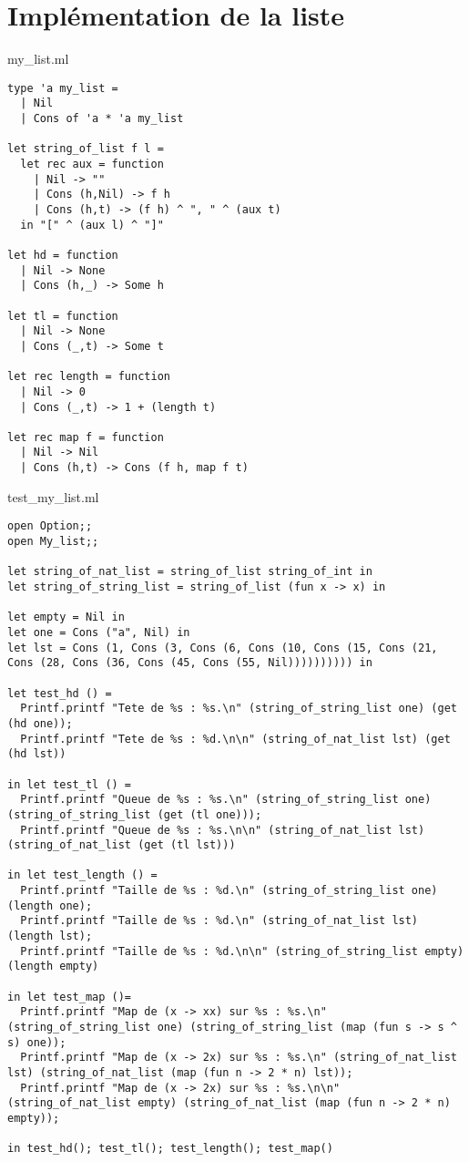 \documentclass{report}
\title{}
\author{}
\date{\today}
\begin{document}
\section{Implémentation de la liste}

{\small my\_list.ml}
\begin{lstlisting}[language=caml, style=xslt]
type 'a my_list = 
  | Nil
  | Cons of 'a * 'a my_list

let string_of_list f l =
  let rec aux = function
    | Nil -> ""
    | Cons (h,Nil) -> f h
    | Cons (h,t) -> (f h) ^ ", " ^ (aux t)
  in "[" ^ (aux l) ^ "]"

let hd = function
  | Nil -> None
  | Cons (h,_) -> Some h

let tl = function
  | Nil -> None
  | Cons (_,t) -> Some t

let rec length = function
  | Nil -> 0
  | Cons (_,t) -> 1 + (length t)

let rec map f = function
  | Nil -> Nil
  | Cons (h,t) -> Cons (f h, map f t)
\end{lstlisting}

{\small test\_my\_list.ml}
\begin{lstlisting}[language=caml, style=xslt]
open Option;;
open My_list;;

let string_of_nat_list = string_of_list string_of_int in
let string_of_string_list = string_of_list (fun x -> x) in

let empty = Nil in
let one = Cons ("a", Nil) in 
let lst = Cons (1, Cons (3, Cons (6, Cons (10, Cons (15, Cons (21, Cons (28, Cons (36, Cons (45, Cons (55, Nil)))))))))) in

let test_hd () = 
  Printf.printf "Tete de %s : %s.\n" (string_of_string_list one) (get (hd one));
  Printf.printf "Tete de %s : %d.\n\n" (string_of_nat_list lst) (get (hd lst))

in let test_tl () = 
  Printf.printf "Queue de %s : %s.\n" (string_of_string_list one) (string_of_string_list (get (tl one)));
  Printf.printf "Queue de %s : %s.\n\n" (string_of_nat_list lst) (string_of_nat_list (get (tl lst)))

in let test_length () = 
  Printf.printf "Taille de %s : %d.\n" (string_of_string_list one) (length one);
  Printf.printf "Taille de %s : %d.\n" (string_of_nat_list lst) (length lst);
  Printf.printf "Taille de %s : %d.\n\n" (string_of_string_list empty) (length empty)

in let test_map ()= 
  Printf.printf "Map de (x -> xx) sur %s : %s.\n" (string_of_string_list one) (string_of_string_list (map (fun s -> s ^ s) one));
  Printf.printf "Map de (x -> 2x) sur %s : %s.\n" (string_of_nat_list lst) (string_of_nat_list (map (fun n -> 2 * n) lst));
  Printf.printf "Map de (x -> 2x) sur %s : %s.\n\n" (string_of_nat_list empty) (string_of_nat_list (map (fun n -> 2 * n) empty));

in test_hd(); test_tl(); test_length(); test_map()
\end{lstlisting}
\end{document}
